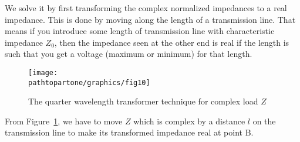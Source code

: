 We solve it by first transforming the complex normalized impedances to a real impedance. This is done by moving along the length of a transmission line. That means if you introduce some length of transmission line with characteristic impedance $ Z_0$, then the impedance seen at the other end is real if the length is such that you get a voltage (maximum or minimum) for that length.
\begin{figure}[h]
\centering
\texttt{[image: \\pathtopartone/graphics/fig10]}
\caption{The quarter wavelength transformer technique for complex load $Z$}
\label{fig:fig10}
\end{figure}

From Figure~\ref{fig:fig10}, we have to move $Z$ which is complex by a distance $l$ on the transmission line to make its transformed impedance real at point B.

